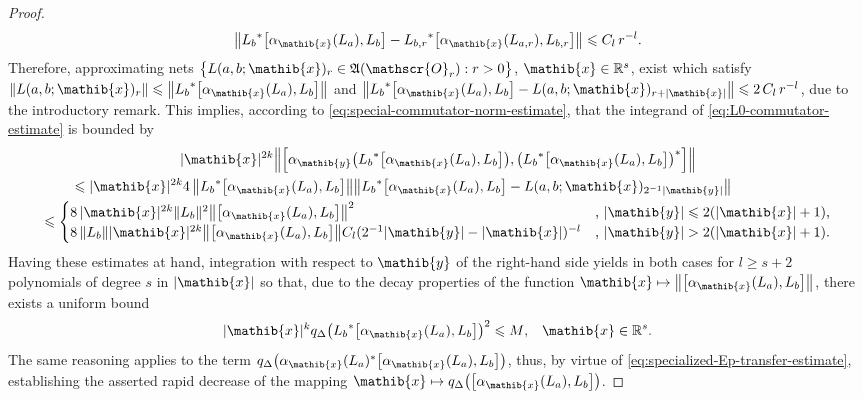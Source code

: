\documentclass[a4paper,a4paper]{article}
\numberwithin{equation}{section}
\newcommand{\xib}{\mathib{x}}
\newcommand{\yib}{\mathib{y}}
\newcommand{\Rs}{\mathbb{R}^s}
\newcommand{\aibx}{\alpha_\mathib{x}}
\newcommand{\aiby}{\alpha_\mathib{y}}
\newcommand{\AOr}{\mathfrak{A} ( \mathscr{O}_r )}
\theoremstyle{definition}
\theoremstyle{plain}
\theoremstyle{remark}
\newcommand{\bset}[1]{\bigl\{ #1 \bigr\}}
\newcommand{\bcomm}[2]{\bigl[ #1 , #2 \bigr]}
\newcommand{\Bcomm}[2]{\Bigl[ #1 , #2 \Bigr]}
\newcommand{\abs}[1]{\lvert #1 \rvert}
\newcommand{\norm}[1]{\lVert #1 \rVert}
\newcommand{\bnorm}[1]{\bigl\lVert #1 \bigr\rVert}
\newcommand{\Bnorm}[1]{\Bigl\lVert #1 \Bigr\rVert}
\newcommand{\bqDx}[1]{q_\Delta \bigl( #1 \bigr)}
\begin{document}
\begin{proof}
\begin{equation}
      \label{eq:commutator-approximant}
      \bnorm{{L_b}^* \bcomm{\aibx ( L_a )}{L_b} - {L_{b , r}}^*
      \bcomm{\aibx ( L_{a , r} )}{L_{b , r}}} \leqslant C_l \, r^{-l}
      \text{.}
    \end{equation}
    Therefore, approximating nets $\bset{L ( a , b ; \xib )_r \in \AOr : r
    > 0}$, $\xib \in \Rs$, exist which satisfy $\norm{L ( a , b ;
    \xib )_r} \leqslant \bnorm{{L_b}^* \bcomm{\aibx ( L_a )}{L_b}}$
    and $\bnorm{{L_b}^* \bcomm{\aibx ( L_a )}{L_b} - L ( a , b ; \xib
    )_{r + \abs{\xib}}} \leqslant 2 \, C_l \, r^{-l}$, due to the
    introductory remark. This implies, according to
    \eqref{eq:special-commutator-norm-estimate}, that the integrand of
    \eqref{eq:L0-commutator-estimate} is bounded by
    \begin{multline}
      \label{eq:La-Lb-commutator-estimate}
      \abs{\xib}^{2 k} \Bnorm{\Bcomm{\aiby \bigl( {L_b}^* \bcomm{\aibx
      ( L_a )}{L_b} \bigr)}{\bigl( {L_b}^* \bcomm{\aibx ( L_a )}{L_b}
      \bigr)^*}} \\
      \mspace{-90mu} \leqslant \abs{\xib}^{2 k} 4 \, \bnorm{{L_b}^*
      \bcomm{\aibx ( L_a )}{L_b}} \bnorm{{L_b}^* \bcomm{\aibx ( L_a
      )}{L_b} - L ( a , b ; \xib )_{2^{-1} \abs{\yib}}} \\
      \leqslant
      \begin{cases}
        8 \, \abs{\xib}^{2 k} \norm{L_b}^2 \bnorm{\bcomm{\aibx ( L_a
        )}{L_b}}^2 & \text{,~} \abs{\yib} \leqslant 2 ( \abs{\xib} + 1
        ) \text{,} \\
        8 \, \norm{L_b} \abs{\xib}^{2 k} \bnorm{\bcomm{\aibx ( L_a
        )}{L_b}} C_l ( 2^{-1} \abs{\yib} - \abs{\xib} )^{-l} &
        \text{,~} \abs{\yib} > 2 ( \abs{\xib} + 1 ) \text{.}
      \end{cases}
    \end{multline}
    Having these estimates at hand, integration with respect to $\yib$
    of the right-hand side yields in both cases for $l \geqslant s +
    2$ polynomials of degree $s$ in $\abs{\xib}$ so that, due to the
    decay properties of the function $\xib \mapsto \bnorm{\bcomm{\aibx
    ( L_a )}{L_b}}$, there exists a uniform bound
    \begin{equation}
      \label{eq:qD-decay}
      \abs{\xib}^k \bqDx{{L_b}^* \bcomm{\aibx ( L_a )}{L_b}}^2
      \leqslant M \text{,} \quad \xib \in \Rs \text{.}
    \end{equation}
    The same reasoning applies to the term $\bqDx{\aibx ( L_a )^*
    \bcomm{\aibx ( L_a )}{L_b}}$, thus, by virtue of
    \eqref{eq:specialized-Ep-transfer-estimate}, establishing the
    asserted rapid decrease of the mapping $\xib \mapsto
    \bqDx{\bcomm{\aibx ( L_a )}{L_b}}$.
    

\end{proof}
\end{document}
